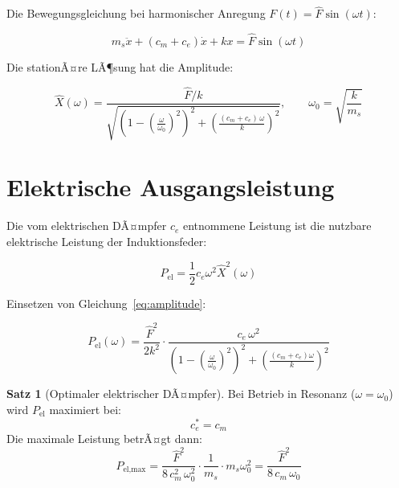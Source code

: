 ﻿\documentclass[12pt, a4paper]{report}
\theoremstyle{definition}
\newtheorem{theorem}{Satz}[section]
\theoremstyle{remark}
\begin{document}
Die Bewegungsgleichung bei harmonischer Anregung $F(t) = \hat{F}\sin(\omega t)$:

\begin{equation}
  m_s \ddot{x} + (c_m + c_e)\dot{x} + k x = \hat{F}\sin(\omega t)
  \label{eq:bewegungsgl}
\end{equation}

Die stationÃ¤re LÃ¶sung hat die Amplitude:

\begin{equation}
  \hat{X}(\omega) = \frac{\hat{F}/k}{\sqrt{\left(1 - \left(\frac{\omega}{\omega_0}\right)^2\right)^2
  + \left(\frac{(c_m + c_e)\,\omega}{k}\right)^2}}, \qquad
  \omega_0 = \sqrt{\frac{k}{m_s}}
  \label{eq:amplitude}
\end{equation}

\section{Elektrische Ausgangsleistung}

Die vom elektrischen DÃ¤mpfer $c_e$ entnommene Leistung ist die nutzbare
elektrische Leistung der Induktionsfeder:

\begin{equation}
  P_{\text{el}} = \frac{1}{2} c_e \omega^2 \hat{X}^2(\omega)
  \label{eq:p_el}
\end{equation}

Einsetzen von Gleichung~\eqref{eq:amplitude}:

\begin{equation}
  P_{\text{el}}(\omega) = \frac{\hat{F}^2}{2k^2} \cdot
  \frac{c_e\,\omega^2}{\left(1-\left(\frac{\omega}{\omega_0}\right)^2\right)^2
  + \left(\frac{(c_m+c_e)\omega}{k}\right)^2}
  \label{eq:p_el_full}
\end{equation}

\begin{theorem}[Optimaler elektrischer DÃ¤mpfer]
  \label{thm:opt_daempfer}
  Bei Betrieb in Resonanz ($\omega = \omega_0$) wird $P_{\text{el}}$ maximiert bei:
  \begin{equation}
    c_e^* = c_m
    \label{eq:ce_opt}
  \end{equation}
  Die maximale Leistung betrÃ¤gt dann:
  \begin{equation}
    P_{\text{el,max}} = \frac{\hat{F}^2}{8\,c_m^2\,\omega_0^2}\cdot\frac{1}{m_s} \cdot m_s \omega_0^2
    = \frac{\hat{F}^2}{8\,c_m\,\omega_0}
    \label{eq:p_el_max}
  \end{equation}
\end{theorem}
\end{document}
